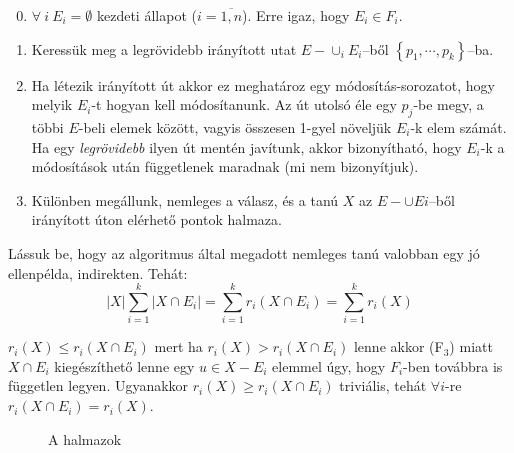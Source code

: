 \begin{enumerate}
    \setcounter{enumi}{-1}
    \item $\forall~i~E_i = \emptyset$ kezdeti állapot ($i=\overline{1,n}$). Erre
    igaz, hogy $E_i \in F_i$.
    \item Keressük meg a legrövidebb irányított utat $E-\cup_{i}E_i$--ből
    $\left\{ p_1, \cdots, p_k \right\}$--ba.
    
    \item Ha létezik irányított út akkor ez meghatároz egy módosítás-sorozatot,
    hogy melyik $E_i$-t hogyan kell módosítanunk. Az út utolsó éle egy $p_j$-be
    megy, a többi $E$-beli elemek között, vagyis összesen 1-gyel növeljük
    $E_i$-k elem számát.  Ha egy {\it legrövidebb} ilyen út mentén javítunk,
    akkor bizonyítható, hogy $E_i$-k a módosítások után függetlenek maradnak (mi
    nem bizonyítjuk).
    \item Különben megállunk, nemleges a válasz, és a tanú $X$ az $E- \cup Ei$--ből
    irányított úton elérhető pontok halmaza.
\end{enumerate} 

Lássuk be, hogy az algoritmus által megadott nemleges tanú valobban egy jó
ellenpélda, indirekten. Tehát:
\[ 
|X| \sum_{i=1}^k |X \cap E_i| = \sum_{i=1}^k r_i(X \cap E_i) = \sum_{i=1}^k r_i(X) 
\]

$r_i(X) \leq r_i(X \cap E_i)$ mert ha $r_i(X) > r_i(X \cap E_i)$  lenne akkor
(F$_3$) miatt $X \cap E_i$ kiegészíthető lenne egy $u \in X - E_i$ elemmel úgy,
hogy $F_i$-ben továbbra is független legyen. Ugyanakkor $r_i(X) \geq r_i(X \cap
E_i)$ triviális, tehát $\forall i$-re $r_i(X \cap E_i) = r_i(X)$.

\begin{figure}[htbp]
\caption{A halmazok}
\label{fig:MPP_halm}
\centering {} 
\end{figure}

